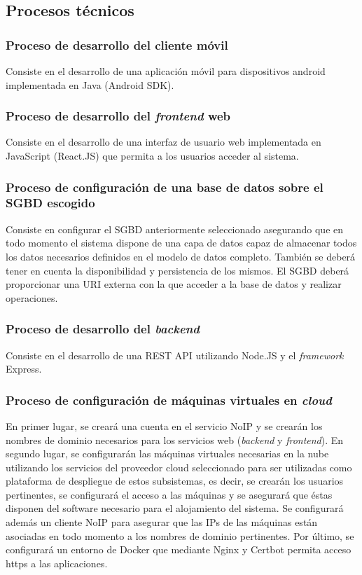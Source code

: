 \documentclass{article}
\begin{document}
\subsection{Procesos técnicos}

\subsubsection{Proceso de desarrollo del cliente móvil} \label{P.T.1}
Consiste en el desarrollo de una aplicación móvil para dispositivos android implementada en Java (Android SDK).

\subsubsection{Proceso de desarrollo del \textit{frontend} web } \label{P.T.2}
Consiste en el desarrollo de una interfaz de usuario web implementada en JavaScript (React.JS) que permita a los usuarios acceder al sistema.

\subsubsection{Proceso de configuración de una base de datos sobre el SGBD escogido} \label{P.T.3}
Consiste en configurar el SGBD anteriormente seleccionado asegurando que en todo momento el sistema dispone de una capa de datos capaz de almacenar todos los datos necesarios definidos en el modelo de datos completo. También se deberá tener en cuenta la disponibilidad y persistencia de los mismos. El SGBD deberá proporcionar una URI externa con la que acceder a la base de datos y realizar operaciones.

\subsubsection{Proceso de desarrollo del \textit{backend}} \label{P.T.4}
Consiste en el desarrollo de una REST API utilizando Node.JS y el \textit{framework} Express.

\subsubsection{Proceso de configuración de máquinas virtuales en \textit{cloud}} \label{P.T.5}

En primer lugar, se creará una cuenta en el servicio NoIP y se crearán los nombres de dominio necesarios para los servicios web (\textit{backend} y \textit{frontend}). En segundo lugar, se configurarán las máquinas virtuales necesarias en la nube utilizando los servicios del proveedor cloud seleccionado para ser utilizadas como plataforma de despliegue de estos subsistemas, es decir, se crearán los usuarios pertinentes, se configurará el acceso a las máquinas y se asegurará que éstas disponen del software necesario para el alojamiento del sistema. Se configurará además un cliente NoIP para asegurar que las IPs de las máquinas están asociadas en todo momento a los nombres de dominio pertinentes. Por último, se configurará un entorno de Docker que mediante Nginx y Certbot permita acceso https a las aplicaciones. 
\end{document}
